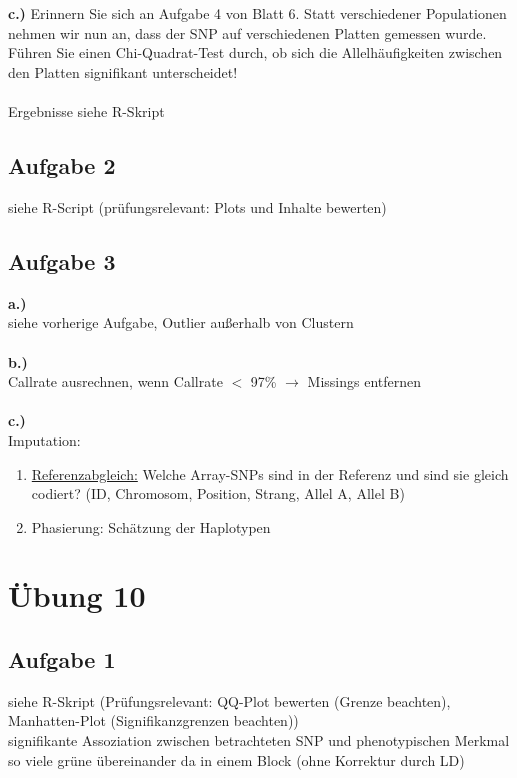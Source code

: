 \documentclass[13pt,a4paper]{article}
\begin{document}
\\\\
\textbf{c.)} Erinnern Sie sich an Aufgabe 4 von Blatt 6. Statt verschiedener Populationen nehmen wir nun an, dass der SNP auf verschiedenen Platten gemessen wurde. Führen Sie einen Chi-Quadrat-Test durch, ob sich die Allelhäufigkeiten zwischen den Platten signifikant unterscheidet!\\\\
Ergebnisse siehe R-Skript

\subsection{Aufgabe 2}
siehe R-Script (prüfungsrelevant: Plots und Inhalte bewerten)

\subsection{Aufgabe 3}
\textbf{a.)}\\
siehe vorherige Aufgabe, Outlier außerhalb von Clustern\\\\
\textbf{b.)}\\
Callrate ausrechnen, wenn Callrate $<$ 97\% $\rightarrow$ Missings entfernen\\\\
\textbf{c.)}\\
Imputation:
\begin{enumerate}
	\item \underline{Referenzabgleich:} Welche Array-SNPs sind in der Referenz und sind sie gleich codiert? (ID, Chromosom, Position, Strang, Allel A, Allel B)
	\item Phasierung: Schätzung der Haplotypen
\end{enumerate}

\newpage
\section{Übung 10}
\subsection{Aufgabe 1}
siehe R-Skript (Prüfungsrelevant: QQ-Plot bewerten (Grenze beachten), Manhatten-Plot (Signifikanzgrenzen beachten))\\
signifikante Assoziation zwischen betrachteten SNP und phenotypischen Merkmal\\
so viele grüne übereinander da in einem Block (ohne Korrektur durch LD)
\end{document}
